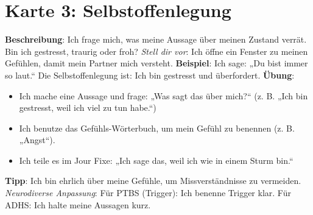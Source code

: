 \documentclass[a4paper,10pt]{article}
\begin{document}
\section*{Karte 3: Selbstoffenlegung}
\begin{tcolorbox}[colback=calmgrey, colframe=calmblue, title={\textbf{Selbstoffenlegung: Was sagt es über mich?}}]
\textbf{Beschreibung}: Ich frage mich, was meine Aussage über meinen Zustand verrät. Bin ich gestresst, traurig oder froh? \newline
\textit{Stell dir vor}: Ich öffne ein Fenster zu meinen Gefühlen, damit mein Partner mich versteht. \newline
\textbf{Beispiel}: Ich sage: „Du bist immer so laut.“ Die Selbstoffenlegung ist: Ich bin gestresst und überfordert. \newline
\textbf{Übung}: 
\begin{itemize}[leftmargin=*]
    \item Ich mache eine Aussage und frage: „Was sagt das über mich?“ (z. B. „Ich bin gestresst, weil ich viel zu tun habe.“)
    \item Ich benutze das Gefühls-Wörterbuch, um mein Gefühl zu benennen (z. B. „Angst“).
    \item Ich teile es im Jour Fixe: „Ich sage das, weil ich wie in einem Sturm bin.“
\end{itemize}
\textbf{Tipp}: Ich bin ehrlich über meine Gefühle, um Missverständnisse zu vermeiden. \newline
\textit{Neurodiverse Anpassung}: Für PTBS (Trigger): Ich benenne Trigger klar. Für ADHS: Ich halte meine Aussagen kurz.
\end{tcolorbox}
\end{document}
